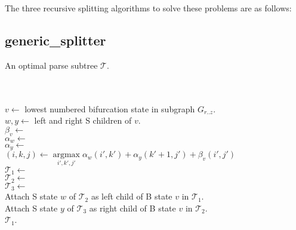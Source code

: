 \documentclass[11pt]{article}
\def\argmax{\mathop{\mathrm{argmax}}\limits}
\begin{document}
The three recursive splitting algorithms to solve these problems
are as follows:

\subsection{generic\_splitter}
\begin{algorithm}
         {An optimal parse subtree $\mathcal{T}$.}

\begin{algtab}
  \algreturn {}\\
  \algreturn {}\\
\algelse
   $v   \leftarrow$ lowest numbered bifurcation state in subgraph $G_{r..z}$.\\
   $w,y \leftarrow$ left and right S children of $v$.\\
   $\beta_v \leftarrow$  \\
   $\alpha_w \leftarrow$ \\
   $\alpha_y \leftarrow$ \\

   $(i,k,j) \leftarrow \argmax_{i',k',j'} \alpha_w(i',k') + \alpha_y(k'+1,j') + \beta_v(i',j')$ \\

   $\mathcal{T}_1   \leftarrow$ \\
   $\mathcal{T}_2 \leftarrow$ \\
   $\mathcal{T}_3 \leftarrow$ \\

   Attach S state $w$ of $\mathcal{T}_2$ as left child of B state $v$ in $\mathcal{T}_1$.\\
   Attach S state $y$ of $\mathcal{T}_3$ as right child of B state $v$ in $\mathcal{T}_2$.\\
  
   \algreturn $\mathcal{T}_1$.\\
\algend
\end{algtab}
\end{algorithm}
\end{document}
